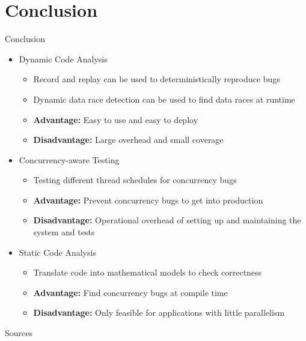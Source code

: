 \documentclass[english,aspectratio=43,t]{beamer}
\begin{document}
\section{Conclusion}
\frame\sectionpage

\begin{frame}{Conclusion}
    \begin{itemize}
        \item<1-> Dynamic Code Analysis
        \begin{itemize}
            \item Record and replay can be used to deterministically reproduce bugs
            \item Dynamic data race detection can be used to find data races at runtime
            \item \textbf{Advantage:} Easy to use and easy to deploy
            \item \textbf{Disadvantage:} Large overhead and small coverage
        \end{itemize}
        \item<2-> Concurrency-aware Testing
        \begin{itemize}
            \item Testing different thread schedules for concurrency bugs
            \item \textbf{Advantage:} Prevent concurrency bugs to get into production
            \item \textbf{Disadvantage:} Operational overhead of setting up and maintaining the system and tests
        \end{itemize}
        \item<3-> Static Code Analysis
        \begin{itemize}
            \item Translate code into mathematical models to check correctness
            \item \textbf{Advantage:} Find concurrency bugs at compile time
            \item \textbf{Disadvantage:} Only feasible for applications with little parallelism
        \end{itemize}
    \end{itemize}
\end{frame}

\begin{frame}{Sources}
    \printbibliography[heading=none]
\end{frame}
\end{document}
